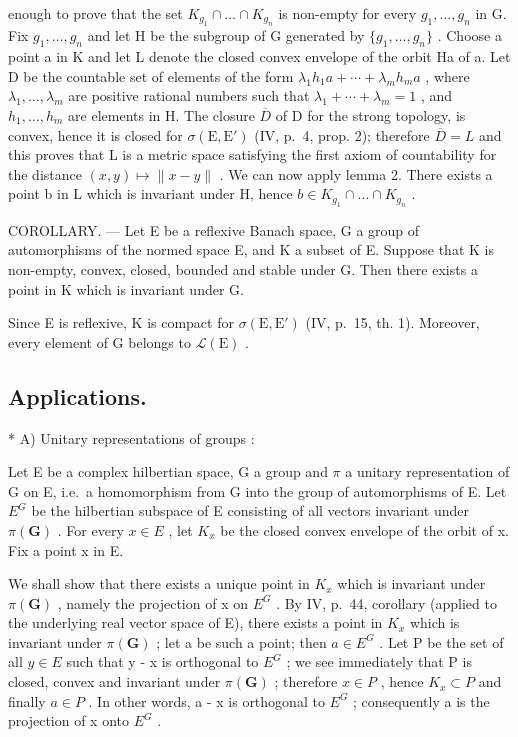 enough to prove that the set \(K_{g_{1}} \cap \ldots \cap K_{g_{n}}\) is non-empty for every \(g_{1}, \ldots, g_{n}\) in G. Fix \(g_{1}, \ldots, g_{n}\) and let H be the subgroup of G generated by \(\{g_{1}, \ldots, g_{n}\}\) . Choose a point a in K and let L denote the closed convex envelope of the orbit Ha of a. Let D be the countable set of elements of the form \(\lambda_{1}h_{1}a + \cdots + \lambda_{m}h_{m}a\) , where \(\lambda_{1}, \ldots, \lambda_{m}\) are positive rational numbers such that \(\lambda_{1} + \cdots + \lambda_{m} = 1\) , and \(h_{1}, \ldots, h_{m}\) are elements in H. The closure \(\overline{D}\) of D for the strong topology, is convex, hence it is closed for \(\sigma(\mathrm{E}, \mathrm{E}')\) (IV, p.~4, prop. 2); therefore \(\overline{D} = L\) and this proves that L is a metric space satisfying the first axiom of countability for the distance \((x, y) \mapsto \|x - y\|\) . We can now apply lemma 2. There exists a point b in L which is invariant under H, hence \(b \in K_{g_{1}} \cap \ldots \cap K_{g_{n}}\) .

COROLLARY. --- Let E be a reflexive Banach space, G a group of automorphisms of the normed space E, and K a subset of E. Suppose that K is non-empty, convex, closed, bounded and stable under G. Then there exists a point in K which is invariant under G.

Since E is reflexive, K is compact for \(\sigma(\mathrm{E}, \mathrm{E}')\) (IV, p.~15, th. 1). Moreover, every element of G belongs to \(\mathcal{L}(\mathrm{E})\) .

\subsection{Applications.}

* A) Unitary representations of groups :

Let E be a complex hilbertian space, G a group and \(\pi\) a unitary representation of G on E, i.e.~a homomorphism from G into the group of automorphisms of E. Let \(E^{G}\) be the hilbertian subspace of E consisting of all vectors invariant under \(\pi(\mathbf{G})\) . For every \(x \in E\) , let \(K_{x}\) be the closed convex envelope of the orbit of x. Fix a point x in E.

We shall show that there exists a unique point in \(K_{x}\) which is invariant under \(\pi(\mathbf{G})\) , namely the projection of x on \(E^{G}\) . By IV, p.~44, corollary (applied to the underlying real vector space of E), there exists a point in \(K_{x}\) which is invariant under \(\pi(\mathbf{G})\) ; let a be such a point; then \(a \in E^{G}\) . Let P be the set of all \(y \in E\) such that y - x is orthogonal to \(E^{G}\) ; we see immediately that P is closed, convex and invariant under \(\pi(\mathbf{G})\) ; therefore \(x \in P\) , hence \(K_{x} \subset P\) and finally \(a \in P\) . In other words, a - x is orthogonal to \(E^{G}\) ; consequently a is the projection of x onto \(E^{G}\) .

